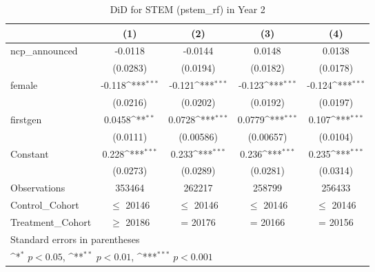 \begin{table}[htbp]\centering
\def\sym#1{\ifmmode^{#1}\else\(^{#1}\)\fi}
\caption{DiD for STEM (pstem\_rf) in Year 2}
\begin{tabular}{l*{4}{c}}
\toprule
                &\multicolumn{1}{c}{(1)}         &\multicolumn{1}{c}{(2)}         &\multicolumn{1}{c}{(3)}         &\multicolumn{1}{c}{(4)}         \\
\midrule
ncp\_announced   &  -0.0118         &  -0.0144         &   0.0148         &   0.0138         \\
                & (0.0283)         & (0.0194)         & (0.0182)         & (0.0178)         \\
\addlinespace
female          &   -0.118\sym{***}&   -0.121\sym{***}&   -0.123\sym{***}&   -0.124\sym{***}\\
                & (0.0216)         & (0.0202)         & (0.0192)         & (0.0197)         \\
\addlinespace
firstgen        &   0.0458\sym{**} &   0.0728\sym{***}&   0.0779\sym{***}&    0.107\sym{***}\\
                & (0.0111)         &(0.00586)         &(0.00657)         & (0.0104)         \\
\addlinespace
Constant        &    0.228\sym{***}&    0.233\sym{***}&    0.236\sym{***}&    0.235\sym{***}\\
                & (0.0273)         & (0.0289)         & (0.0281)         & (0.0314)         \\
\midrule
Observations    &   353464         &   262217         &   258799         &   256433         \\
Control\_Cohort  &$\le$ 20146         &$\le$ 20146         &$\le$ 20146         &$\le$ 20146         \\
Treatment\_Cohort&$\ge$ 20186         &  = 20176         &  = 20166         &  = 20156         \\
\bottomrule
\multicolumn{5}{l}{\footnotesize Standard errors in parentheses}\\
\multicolumn{5}{l}{\footnotesize \sym{*} \(p<0.05\), \sym{**} \(p<0.01\), \sym{***} \(p<0.001\)}\\
\end{tabular}
\end{table}
